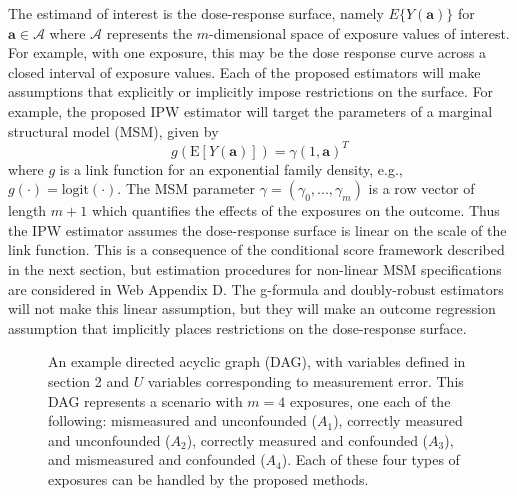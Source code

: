 \documentclass[useAMS,usenatbib,referee]{biom}
\begin{document}
The estimand of interest is the dose-response surface, namely $E\{ Y(\bm{a}) \}$ for $\bm{a} \in \bm{\mathcal{A}}$ where $\bm{\mathcal{A}}$ represents the $m$-dimensional space of exposure values of interest. For example, with one exposure, this may be the dose response curve across a closed interval of exposure values. Each of the proposed estimators will make assumptions that explicitly or implicitly impose restrictions on the surface. For example, the proposed IPW estimator will target the parameters of a marginal structural model (MSM), given by
\begin{equation}
    g(\text{E}[Y(\bm{a})]) = \gamma (1, \bm{a})^{T}
\end{equation}
where $g$ is a link function for an exponential family density, e.g., $g(\cdot) = \text{logit}(\cdot)$. The MSM parameter $\gamma = (\gamma_{0}, ..., \gamma_{m})$ is a row vector of length $m+1$ which quantifies the effects of the exposures on the outcome. Thus the IPW estimator assumes the dose-response surface is linear on the scale of the link function. This is a consequence of the conditional score framework described in the next section, but estimation procedures for non-linear MSM specifications are considered in Web Appendix D. The g-formula and doubly-robust estimators will not make this linear assumption, but they will make an outcome regression assumption that implicitly places restrictions on the dose-response surface.

\begin{figure}
\centering
{}
\caption{An example directed acyclic graph (DAG), with variables defined in section 2 and $U$ variables corresponding to measurement error. This DAG represents a scenario with $m=4$ exposures, one each of the following: mismeasured and unconfounded ($A_{1}$), correctly measured and unconfounded ($A_{2}$), correctly measured and confounded ($A_{3}$), and mismeasured and confounded ($A_{4}$). Each of these four types of exposures can be handled by the proposed methods.}
\label{fig:one}
\end{figure}
\end{document}
